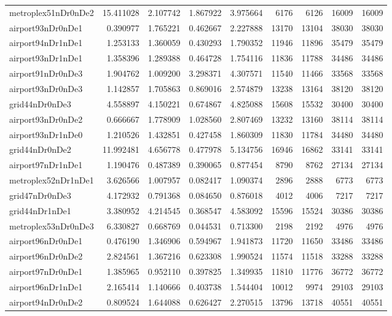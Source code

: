 \begin{longtable}{|l|r|r|r|r|r|r|r|r|}
metroplex51nDr0nDe2 & 15.411028 & 2.107742 & 1.867922 & 3.975664 & 6176 & 6126 & 16009 & 16009 \\
airport93nDr0nDe1 & 0.390977 & 1.765221 & 0.462667 & 2.227888 & 13170 & 13104 & 38030 & 38030 \\
airport94nDr1nDe1 & 1.253133 & 1.360059 & 0.430293 & 1.790352 & 11946 & 11896 & 35479 & 35479 \\
airport93nDr1nDe1 & 1.358396 & 1.289388 & 0.464728 & 1.754116 & 11836 & 11788 & 34486 & 34486 \\
airport91nDr0nDe3 & 1.904762 & 1.009200 & 3.298371 & 4.307571 & 11540 & 11466 & 33568 & 33568 \\
airport93nDr0nDe3 & 1.142857 & 1.705863 & 0.869016 & 2.574879 & 13238 & 13164 & 38120 & 38120 \\
grid44nDr0nDe3 & 4.558897 & 4.150221 & 0.674867 & 4.825088 & 15608 & 15532 & 30400 & 30400 \\
airport93nDr0nDe2 & 0.666667 & 1.778909 & 1.028560 & 2.807469 & 13232 & 13160 & 38114 & 38114 \\
airport93nDr1nDe0 & 1.210526 & 1.432851 & 0.427458 & 1.860309 & 11830 & 11784 & 34480 & 34480 \\
grid44nDr0nDe2 & 11.992481 & 4.656778 & 0.477978 & 5.134756 & 16946 & 16862 & 33141 & 33141 \\
airport97nDr1nDe1 & 1.190476 & 0.487389 & 0.390065 & 0.877454 & 8790 & 8762 & 27134 & 27134 \\
metroplex52nDr1nDe1 & 3.626566 & 1.007957 & 0.082417 & 1.090374 & 2896 & 2888 & 6773 & 6773 \\
grid47nDr0nDe3 & 4.172932 & 0.791368 & 0.084650 & 0.876018 & 4012 & 4006 & 7217 & 7217 \\
grid44nDr1nDe1 & 3.380952 & 4.214545 & 0.368547 & 4.583092 & 15596 & 15524 & 30386 & 30386 \\
metroplex53nDr0nDe3 & 6.330827 & 0.668769 & 0.044531 & 0.713300 & 2198 & 2192 & 4976 & 4976 \\
airport96nDr0nDe1 & 0.476190 & 1.346906 & 0.594967 & 1.941873 & 11720 & 11650 & 33486 & 33486 \\
airport96nDr0nDe2 & 2.824561 & 1.367216 & 0.623308 & 1.990524 & 11574 & 11518 & 33288 & 33288 \\
airport97nDr0nDe1 & 1.385965 & 0.952110 & 0.397825 & 1.349935 & 11810 & 11776 & 36772 & 36772 \\
airport96nDr1nDe1 & 2.165414 & 1.140666 & 0.403738 & 1.544404 & 10012 & 9974 & 29103 & 29103 \\
airport94nDr0nDe2 & 0.809524 & 1.644088 & 0.626427 & 2.270515 & 13796 & 13718 & 40551 & 40551 \\

\end{longtable}
